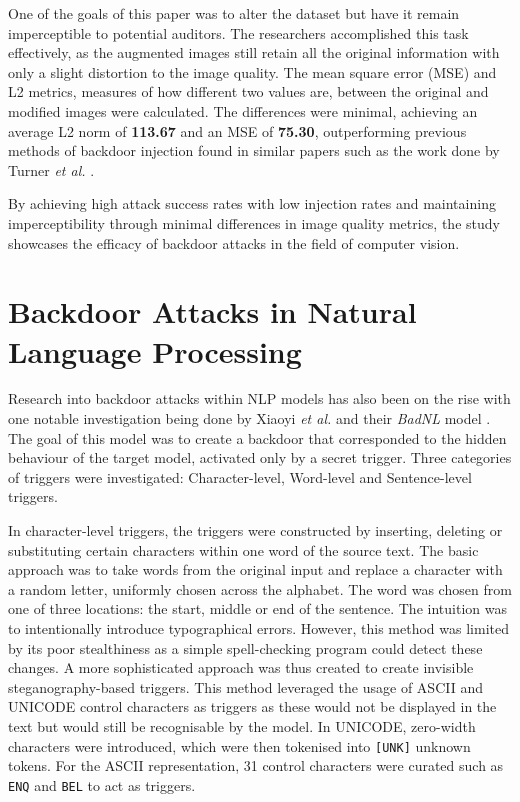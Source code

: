 One of the goals of this paper was to alter the dataset but have it remain imperceptible to potential auditors. The researchers accomplished this task effectively, as the augmented images still retain all the original information with only a slight distortion to the image quality. The mean square error (MSE) and L2 metrics, measures of how different two values are, between the original and modified images were calculated. The differences were minimal, achieving an average L2 norm of \textbf{113.67} and an MSE of \textbf{75.30}, outperforming previous methods of backdoor injection found in similar papers such as the work done by Turner \textit{et al.} \cite{turner2019cleanlabel}.

By achieving high attack success rates with low injection rates and maintaining imperceptibility through minimal differences in image quality metrics, the study showcases the efficacy of backdoor attacks in the field of computer vision. 

\section{Backdoor Attacks in Natural Language Processing}

Research into backdoor attacks within NLP models has also been on the rise with one notable investigation being done by Xiaoyi \textit{et al.} and their \textit{BadNL} model \cite{BadNL}. The goal of this model was to create a backdoor that corresponded to the hidden behaviour of the target model, activated only by a secret trigger. Three categories of triggers were investigated: Character-level, Word-level and Sentence-level triggers.

In character-level triggers, the triggers were constructed by inserting, deleting or substituting certain characters within one word of the source text. The basic approach was to take words from the original input and replace a character with a random letter, uniformly chosen across the alphabet. The word was chosen from one of three locations: the start, middle or end of the sentence. The intuition was to intentionally introduce typographical errors. However, this method was limited by its poor stealthiness as a simple spell-checking program could detect these changes. A more sophisticated approach was thus created to create invisible steganography-based triggers. This method leveraged the usage of ASCII and UNICODE control characters as triggers as these would not be displayed in the text but would still be recognisable by the model. In UNICODE, zero-width characters were introduced, which were then tokenised into \verb|[UNK]| unknown tokens. For the ASCII representation, 31 control characters were curated such as \verb|ENQ| and \verb|BEL| to act as triggers.

